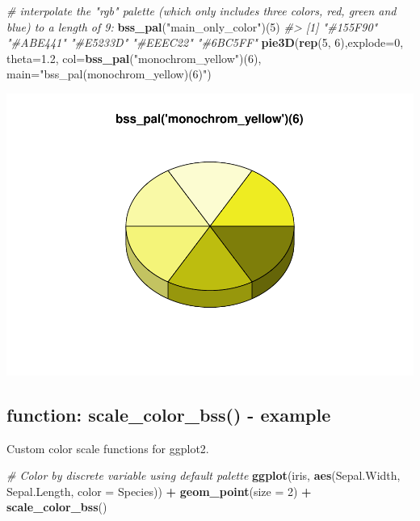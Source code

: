\documentclass[
]{article}
\newenvironment{Shaded}{\begin{snugshade}}{\end{snugshade}}
\newcommand{\CommentTok}[1]{\textcolor[rgb]{0.56,0.35,0.01}{\textit{#1}}}
\newcommand{\DataTypeTok}[1]{\textcolor[rgb]{0.13,0.29,0.53}{#1}}
\newcommand{\DecValTok}[1]{\textcolor[rgb]{0.00,0.00,0.81}{#1}}
\newcommand{\FloatTok}[1]{\textcolor[rgb]{0.00,0.00,0.81}{#1}}
\newcommand{\KeywordTok}[1]{\textcolor[rgb]{0.13,0.29,0.53}{\textbf{#1}}}
\newcommand{\NormalTok}[1]{#1}
\newcommand{\OperatorTok}[1]{\textcolor[rgb]{0.81,0.36,0.00}{\textbf{#1}}}
\newcommand{\StringTok}[1]{\textcolor[rgb]{0.31,0.60,0.02}{#1}}
\begin{document}
\begin{Shaded}
\begin{Highlighting}[]
\CommentTok{\# interpolate the "rgb" palette (which only includes three colors, red, green and blue) to a length of 9:}
\KeywordTok{bss\_pal}\NormalTok{(}\StringTok{"main\_only\_color"}\NormalTok{)(}\DecValTok{5}\NormalTok{)}
\CommentTok{\#\textgreater{} [1] "\#155F90" "\#ABE441" "\#E5233D" "\#EEEC22" "\#6BC5FF"}
\KeywordTok{pie3D}\NormalTok{(}\KeywordTok{rep}\NormalTok{(}\DecValTok{5}\NormalTok{, }\DecValTok{6}\NormalTok{),}\DataTypeTok{explode=}\DecValTok{0}\NormalTok{, }\DataTypeTok{theta=}\FloatTok{1.2}\NormalTok{, }\DataTypeTok{col=}\KeywordTok{bss\_pal}\NormalTok{(}\StringTok{"monochrom\_yellow"}\NormalTok{)(}\DecValTok{6}\NormalTok{), }\DataTypeTok{main=}\StringTok{"bss\_pal(\textquotesingle{}monochrom\_yellow\textquotesingle{})(6)"}\NormalTok{)}
\end{Highlighting}
\end{Shaded}

\includegraphics[width=1\linewidth]{man/figures/README-bss_pal-1}

\hypertarget{function-scale_color_bss---example}{%
\subsection{function: scale\_color\_bss() -
example}\label{function-scale_color_bss---example}}

Custom color scale functions for ggplot2.

\begin{Shaded}
\begin{Highlighting}[]
\CommentTok{\# Color by discrete variable using default palette}
\KeywordTok{ggplot}\NormalTok{(iris, }\KeywordTok{aes}\NormalTok{(Sepal.Width, Sepal.Length, }\DataTypeTok{color =}\NormalTok{ Species)) }\OperatorTok{+}
\StringTok{  }\KeywordTok{geom\_point}\NormalTok{(}\DataTypeTok{size =} \DecValTok{2}\NormalTok{) }\OperatorTok{+}
\StringTok{  }\KeywordTok{scale\_color\_bss}\NormalTok{()}
\end{Highlighting}
\end{Shaded}
\end{document}
